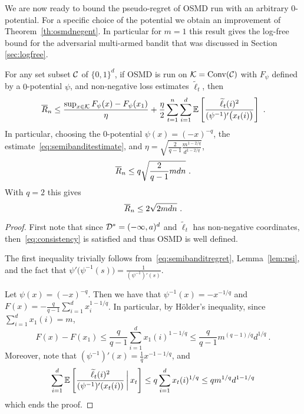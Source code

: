 %
We are now ready to bound the pseudo-regret of OSMD run with an arbitrary $0$-potential. For a specific choice of the potential we obtain an improvement of Theorem~\ref{th:osmdnegent}. In particular for $m=1$ this result gives the log-free bound for the adversarial multi-armed bandit that was discussed in Section \ref{sec:logfree}.
\begin{theorem} \label{th:osmdzero}
For any set subset $\mathcal{C}$ of $\{0,1\}^d$, if OSMD is run on $\mathcal{K}=\mathrm{Conv}(\mathcal{C})$ with $F_{\psi}$ defined by a $0$-potential $\psi$, and non-negative loss estimates $\tilde{\ell}_t$, then
$$\overline{R}_n \leq \frac{\sup_{x \in \mathcal{K}} F_{\psi}(x) - F_{\psi}(x_1)}{\eta} + \frac{\eta}{2} \sum_{t=1}^n \sum_{i=1}^d \mathbb{E}\left[\frac{\widetilde{\ell}_t(i)^2}{(\psi^{-1})'\bigl(x_t(i)\bigr)}\right]~.$$
In particular, choosing the $0$-potential $\psi(x) = (- x)^{-q}$, the estimate~\eqref{eq:semibanditestimate}, and $\eta= \sqrt{\frac{2}{q-1} \frac{m^{1 - 2/q}}{d^{1 - 2/q}}}$,
$$\overline{R}_n \leq q \sqrt{\frac{2}{q-1} m d n}~.$$
With $q=2$ this gives
$$\overline{R}_n \leq 2 \sqrt{2 m d n}~.$$ 
\end{theorem}
%
\begin{proof}
First note that since $\mathcal{D}^*=(-\infty,a)^d$ and $\tilde{\ell}_t$ has non-negative coordinates, then~\eqref{eq:consistency} is satisfied and thus OSMD is well defined.

The first inequality trivially follows from~\eqref{eq:semibanditregret}, Lemma~\ref{lem:psi}, and the fact that $\psi'\bigl(\psi^{-1}(s)\bigr) = \frac{1}{(\psi^{-1})'(s)}$.

Let $\psi(x) = (- x)^{-q}$. Then we have that $\psi^{-1}(x) = - x^{-1/q}$ and $F(x)= - \frac{q}{q-1} \sum_{i=1}^d x_i^{1 - 1/q}$. In particular, by H{\"o}lder's inequality, since $\sum_{i=1}^d x_1(i) =m$,
$$F(x) - F(x_1) \leq \frac{q}{q-1} \sum_{i=1}^d x_1(i)^{1 - 1/q} \leq \frac{q}{q-1} m^{(q-1)/q} d^{1/q}~.$$
Moreover, note that $(\psi^{-1})'(x) = \frac1q x^{- 1 - 1/q}$, and
$$\sum_{i=1}^d \mathbb{E}\left[\frac{\widetilde{\ell}_t(i)^2}{(\psi^{-1})'(x_t(i))} \,\bigg|\, x_t \right] \leq q \sum_{i=1}^d x_t(i)^{1/q} \leq q m^{1/q} d^{1 - 1/q}$$
which ends the proof.
\end{proof}

